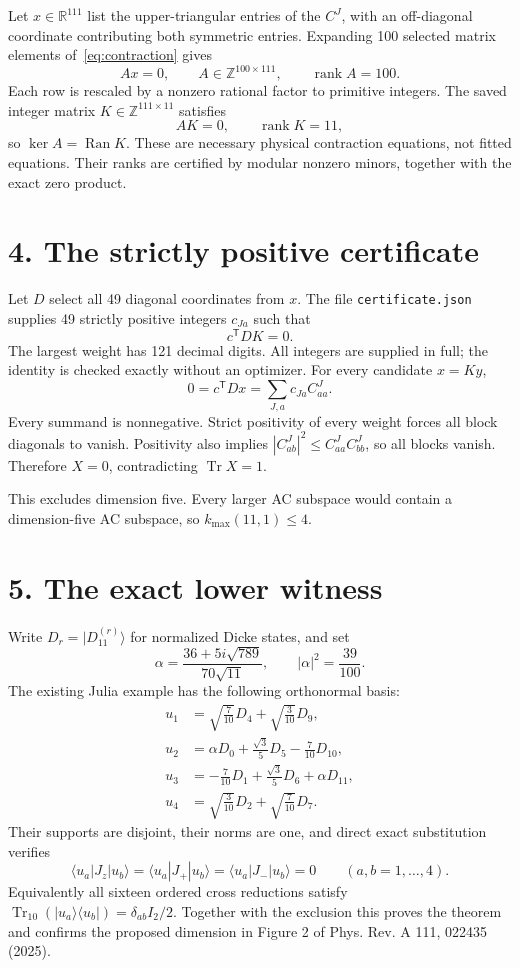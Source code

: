 \documentclass[11pt]{article}
\newcommand{\Tr}{\operatorname{Tr}}
\newcommand{\Ran}{\operatorname{Ran}}
\begin{document}
Let $x\in\mathbb R^{111}$ list the upper-triangular entries of the $C^J$, with an off-diagonal coordinate contributing both symmetric entries. Expanding 100 selected matrix elements of~\eqref{eq:contraction} gives
\[
Ax=0,\qquad A\in\mathbb Z^{100\times111},\qquad\operatorname{rank}A=100.
\]
Each row is rescaled by a nonzero rational factor to primitive integers. The saved integer matrix $K\in\mathbb Z^{111\times11}$ satisfies
\[
AK=0,\qquad\operatorname{rank}K=11,
\]
so $\ker A=\Ran K$. These are necessary physical contraction equations, not fitted equations. Their ranks are certified by modular nonzero minors, together with the exact zero product.

\section*{4. The strictly positive certificate}
Let $D$ select all 49 diagonal coordinates from $x$. The file \texttt{certificate.json} supplies 49 strictly positive integers $c_{Ja}$ such that
\[
\boxed{c^{\mathsf T}DK=0.}
\]
The largest weight has 121 decimal digits. All integers are supplied in full; the identity is checked exactly without an optimizer. For every candidate $x=Ky$,
\[
0=c^{\mathsf T}Dx=\sum_{J,a}c_{Ja}C^J_{aa}.
\]
Every summand is nonnegative. Strict positivity of every weight forces all block diagonals to vanish. Positivity also implies $|C^J_{ab}|^2\le C^J_{aa}C^J_{bb}$, so all blocks vanish. Therefore $X=0$, contradicting $\Tr X=1$.

This excludes dimension five. Every larger AC subspace would contain a dimension-five AC subspace, so $k_{\max}(11,1)\le4$.

\section*{5. The exact lower witness}
Write $D_r=|D_{11}^{(r)}\rangle$ for normalized Dicke states, and set
\[
\alpha=\frac{36+5i\sqrt{789}}{70\sqrt{11}},\qquad |\alpha|^2=\frac{39}{100}.
\]
The existing Julia example has the following orthonormal basis:
\begin{align*}
u_1&=\sqrt{\frac7{10}}D_4+\sqrt{\frac3{10}}D_9,\\
u_2&=\alpha D_0+\frac{\sqrt3}{5}D_5-\frac7{10}D_{10},\\
u_3&=-\frac7{10}D_1+\frac{\sqrt3}{5}D_6+\alpha D_{11},\\
u_4&=\sqrt{\frac3{10}}D_2+\sqrt{\frac7{10}}D_7.
\end{align*}
Their supports are disjoint, their norms are one, and direct exact substitution verifies
\[
\langle u_a|J_z|u_b\rangle=
\langle u_a|J_+|u_b\rangle=
\langle u_a|J_-|u_b\rangle=0
\qquad(a,b=1,\ldots,4).
\]
Equivalently all sixteen ordered cross reductions satisfy
$\Tr_{10}(|u_a\rangle\langle u_b|)=\delta_{ab}I_2/2$.
Together with the exclusion this proves the theorem and confirms the proposed dimension in Figure 2 of Phys. Rev. A 111, 022435 (2025).
\end{document}
